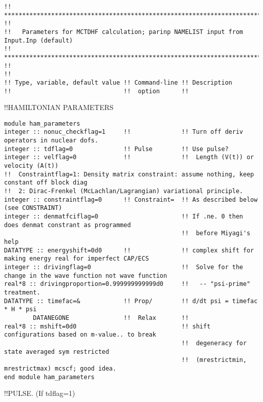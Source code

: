 \begin{verbatim}
!! *********************************************************************************************************** !!
!!   Parameters for MCTDHF calculation; parinp NAMELIST input from Input.Inp (default)
!! *********************************************************************************************************** !!
!!
!! Type, variable, default value !! Command-line !! Description 
!!                               !!  option      !! 
\end{verbatim}
!!{\large \quad HAMILTONIAN PARAMETERS}
\begin{verbatim}
module ham_parameters
integer :: nonuc_checkflag=1     !!              !! Turn off deriv operators in nuclear dofs.
integer :: tdflag=0              !! Pulse        !! Use pulse?
integer :: velflag=0             !!              !!  Length (V(t)) or velocity (A(t))      
!!  Constraintflag=1: Density matrix constraint: assume nothing, keep constant off block diag
!!  2: Dirac-Frenkel (McLachlan/Lagrangian) variational principle.
integer :: constraintflag=0      !! Constraint=  !! As described below (see CONSTRAINT)
integer :: denmatfciflag=0                       !! If .ne. 0 then does denmat constrant as programmed
                                                 !!  before Miyagi's help
DATATYPE :: energyshift=0d0      !!              !! complex shift for making energy real for imperfect CAP/ECS
integer :: drivingflag=0                         !!  Solve for the change in the wave function not wave function 
real*8 :: drivingproportion=0.999999999999d0     !!   -- "psi-prime" treatment.
DATATYPE :: timefac=&            !! Prop/        !! d/dt psi = timefac * H * psi
        DATANEGONE               !!  Relax       !!
real*8 :: mshift=0d0                             !! shift configurations based on m-value.. to break 
                                                 !!  degeneracy for state averaged sym restricted
                                                 !!  (mrestrictmin, mrestrictmax) mcscf; good idea.
end module ham_parameters
\end{verbatim}
!!{\large \quad PULSE.  (If tdflag=1) }
